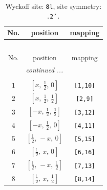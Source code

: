 \documentclass[fleqn,8pt]{jsarticle}
\begin{document}
\begin{longtable}{ccc}
\caption{Wyckoff site: {\tt 8l}, site symmetry: {\tt .2'.}}
 \\
 \hline \hline
No. & position & mapping \\ \hline \endfirsthead

\multicolumn{2}{l}{\tablename\ \thetable{}} \\
 \hline \hline
No. & position & mapping \\ \hline \endhead

 \hline \hline
\multicolumn{2}{r}{\footnotesize\it continued ...} \\ \endfoot

 \hline \hline
\multicolumn{2}{r}{} \\ \endlastfoot

1 & $\left[ x,\, \frac{1}{2},\, 0 \right]$ & {\tt [1,10]} \\ \hline
2 & $\left[ x,\, \frac{1}{2},\, \frac{1}{2} \right]$ & {\tt [2,9]} \\ \hline
3 & $\left[ - x,\, \frac{1}{2},\, \frac{1}{2} \right]$ & {\tt [3,12]} \\ \hline
4 & $\left[ - x,\, \frac{1}{2},\, 0 \right]$ & {\tt [4,11]} \\ \hline
5 & $\left[ \frac{1}{2},\, - x,\, 0 \right]$ & {\tt [5,15]} \\ \hline
6 & $\left[ \frac{1}{2},\, x,\, 0 \right]$ & {\tt [6,16]} \\ \hline
7 & $\left[ \frac{1}{2},\, - x,\, \frac{1}{2} \right]$ & {\tt [7,13]} \\ \hline
8 & $\left[ \frac{1}{2},\, x,\, \frac{1}{2} \right]$ & {\tt [8,14]} \\
\end{longtable}
\renewcommand{\arraystretch}{1.2}
\end{document}
